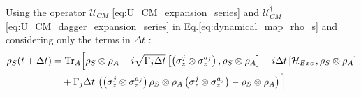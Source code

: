 \documentclass[a4paper,12pt]{article}
\begin{document}
	Using the operator $ \mathcal{U}_{CM} $ \eqref{eq:U_CM_expansion_series} and $ \mathcal{U}_{CM}^{\dagger} $ \eqref{eq:U_CM_dagger_expansion_series} in Eq.\eqref{eq:dynamical_map_rho_s} and considering only the terms in $ \Delta t $ :
	\begin{align}
		\rho_{S}(t + \Delta t) &= \text{Tr}_A \Big[ \rho_{S} \otimes \rho_{A} - i \sqrt{\Gamma_j \Delta t} \left[ \left( \sigma_{z}^{j} \otimes \sigma_{z}^{a_j} \right) , \rho_{S} \otimes \rho_{A} \right] -i \Delta t \left[ \mathcal{H}_{Exc} \, , \rho_{S} \otimes \rho_{A} \right] \notag \\
		& \quad + \Gamma_{j} \Delta t \, \left( \left( \sigma_{z}^{j} \otimes \sigma_{z}^{a_j} \right) \rho_{S} \otimes \rho_{A} \left( \sigma_{z}^{j} \otimes \sigma_{z}^{a_j} \right) - \rho_{S} \otimes \rho_{A}  \right)  \Big]
		\label{eq:complete_rho_evo_diff_cohe}
	\end{align}
\end{document}
